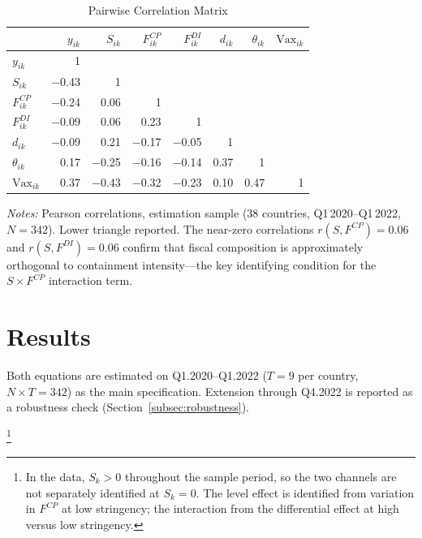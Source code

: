 \documentclass[12pt, a4paper]{article}
\begin{document}
\begin{table}[H]
\centering
\caption{Pairwise Correlation Matrix}
\label{tab:corr_matrix}
\small
\begin{tabular}{@{} l r r r r r r r @{}}
\toprule
 & $y_{ik}$ & $S_{ik}$ & $F^{CP}_{ik}$ & $F^{DI}_{ik}$
 & $d_{ik}$ & $\theta_{ik}$ & $\text{Vax}_{ik}$ \\
\midrule
$y_{ik}$           & 1    &       &       &       &       &       &  \\
$S_{ik}$           & $-$0.43 & 1  &       &       &       &       &  \\
$F^{CP}_{ik}$      & $-$0.24 & 0.06  & 1  &       &       &       &  \\
$F^{DI}_{ik}$      & $-$0.09 & 0.06  & 0.23  & 1  &       &       &  \\
$d_{ik}$           & $-$0.09 & 0.21  & $-$0.17 & $-$0.05 & 1  &       &  \\
$\theta_{ik}$      & 0.17  & $-$0.25 & $-$0.16 & $-$0.14 & 0.37  & 1  &  \\
$\text{Vax}_{ik}$  & 0.37  & $-$0.43 & $-$0.32 & $-$0.23 & 0.10  & 0.47  & 1 \\
\bottomrule
\end{tabular}
\vspace{4pt}

\parbox{\textwidth}{\footnotesize\textit{Notes:} Pearson correlations,
estimation sample (38 countries, Q1\,2020--Q1\,2022, $N = 342$).
Lower triangle reported. The near-zero correlations
$r(S, F^{CP}) = 0.06$ and $r(S, F^{DI}) = 0.06$ confirm that fiscal
composition is approximately orthogonal to containment intensity---the
key identifying condition for the $S \times F^{CP}$ interaction term.}
\end{table}

\newpage

\section{Results}
\label{sec:results_empirical}
Both equations are estimated on Q1.2020--Q1.2022 ($T = 9$ per country,
$N \times T = 342$) as the main specification. Extension through Q4.2022
is reported as a robustness check (Section~\ref{subsec:robustness}).

\footnote{In the data, $S_k > 0$ throughout the sample period, so the two channels are not separately identified at $S_k = 0$. The level effect is identified from variation in $F^{CP}$ at low stringency; the interaction from the differential effect at high versus low stringency.}
\end{document}
